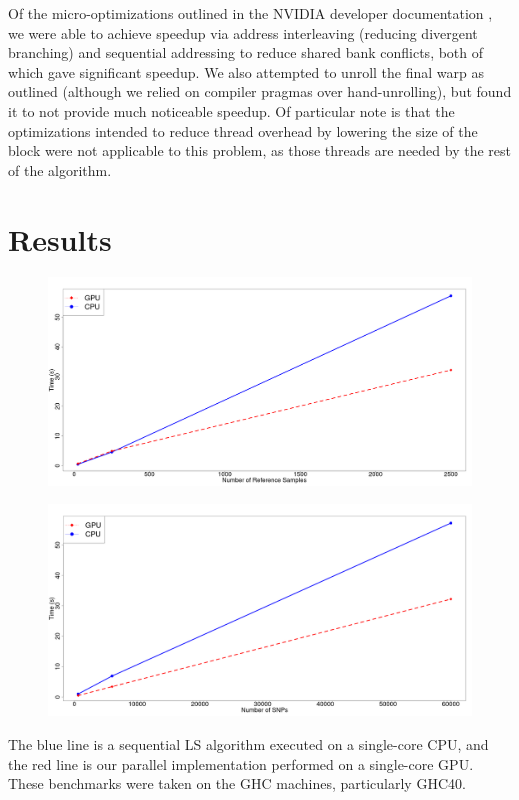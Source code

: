 \documentclass[12pt]{article}
\begin{document}
Of the micro-optimizations outlined in the NVIDIA developer
documentation \cite{reduceopt}, we were able to achieve speedup via address
interleaving (reducing divergent branching) and sequential addressing to reduce
shared bank conflicts, both of which gave significant speedup. We also
attempted to unroll the final warp as outlined (although we relied on compiler
pragmas over hand-unrolling), but found it to not provide much noticeable
speedup. Of particular note is that the optimizations intended to reduce
thread overhead by lowering the size of the block were not applicable to this
problem, as those threads are needed by the rest of the algorithm.

\newpage
\section{Results}

{
\begin{figure}[!hb]
  \includegraphics[scale=0.2]{sample}
\end{figure}
\begin{figure}[!hb]
  \includegraphics[scale=0.2]{snp}
\end{figure}
}

The blue line is a sequential LS algorithm executed on a single-core CPU, and
the red line is our parallel implementation performed on a single-core GPU.
These benchmarks were taken on the GHC machines, particularly GHC40.
\end{document}
